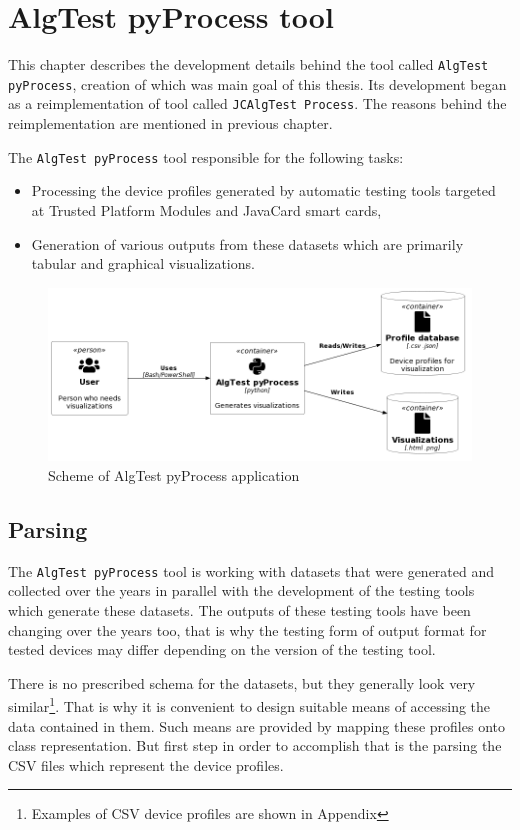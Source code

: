\chapter{AlgTest pyProcess tool}
This chapter describes the development details behind the tool called \texttt{AlgTest pyProcess}, creation of which was main goal of this thesis. Its development began as a reimplementation of tool called \texttt{JCAlgTest Process}. The reasons behind the reimplementation are mentioned in previous chapter.

The \texttt{AlgTest pyProcess} tool responsible for the following tasks:
\begin{itemize}
    \item Processing the device profiles generated by automatic testing tools targeted at Trusted Platform Modules and JavaCard smart cards,
    \item Generation of various outputs from these datasets which are primarily tabular and graphical visualizations.
\end{itemize}
\begin{figure}[h]
    \centering
    \includegraphics[width=\textwidth]{img/scheme.png}
    \caption{Scheme of AlgTest pyProcess application}
    \label{fig:algtest-process-scheme}
\end{figure}


\section{Parsing}
The \texttt{AlgTest pyProcess} tool is working with datasets that were generated and collected over the years in parallel with the development of the testing tools which generate these datasets. The outputs of these testing tools have been changing over the years too, that is why the testing form of output format for tested devices may differ depending on the version of the testing tool.

There is no prescribed schema for the datasets, but they generally look very similar\footnote{Examples of CSV device profiles are shown in Appendix}. That is why it is convenient to design suitable means of accessing the data contained in them. Such means are provided by mapping these profiles onto class representation. But first step in order to accomplish that is the parsing the CSV files which represent the device profiles. 



